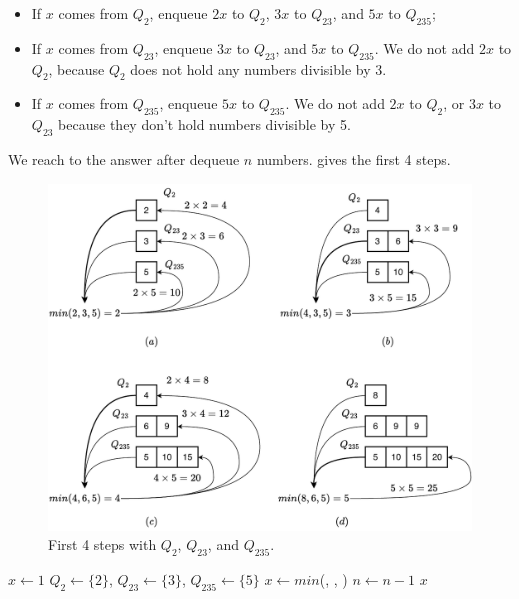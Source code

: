 \documentclass[b5paper]{article}
\begin{document}
\begin{itemize}
\item If $x$ comes from $Q_2$, enqueue $2x$ to $Q_2$, $3x$ to $Q_{23}$, and $5x$ to $Q_{235}$;
\item If $x$ comes from $Q_{23}$, enqueue $3x$ to $Q_{23}$, and $5x$ to $Q_{235}$. We do not add $2x$ to $Q_2$, because $Q_2$ does not hold any numbers divisible by 3.
\item If $x$ comes from $Q_{235}$, enqueue $5x$ to $Q_{235}$. We do not add $2x$ to $Q_2$, or $3x$ to $Q_{23}$ because they don't hold numbers divisible by 5.
\end{itemize}

We reach to the answer after dequeue $n$ numbers.  gives the first 4 steps.

\begin{figure}[htbp]
  \centering
  \includegraphics[scale=0.5]{img/q235}
  \caption{First 4 steps with $Q_2$, $Q_{23}$, and $Q_{235}$.}
  \label{fig:q235}
\end{figure}

\begin{algorithmic}[1]
  \State $x \gets 1$
  \State $Q_2 \gets \{ 2 \}$, $Q_{23} \gets \{ 3 \}$, $Q_{235} \gets \{ 5 \}$
    \State $x \gets min$(, , )
      \State {}
      \State {}
      \State {}
      \State {}
      \State {}
      \State {}
      \State {}
    \Else
      \State {}
      \State {}
    \EndIf
    \State $n \gets n - 1$
  \EndWhile
  \State \Return $x$
\EndFunction
\end{algorithmic}
\end{document}
